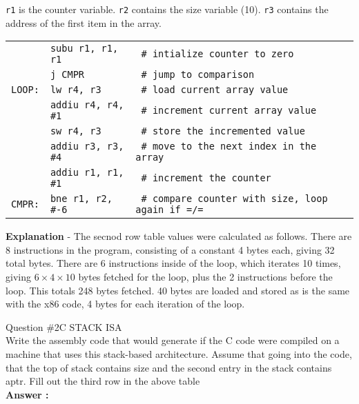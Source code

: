 \documentclass[a4paper,11pt]{article}
\newcommand{\answer}{\textbf{Answer : }}
\begin{document}
 \texttt{r1} is the counter variable. \texttt{r2} contains the size variable (10). \texttt{r3} contains the address of the first item in the array.
 \begin{center}
   \begin{tabular}{l l  l}
      \texttt{}      & \texttt{subu r1, r1, r1}    & \texttt{ \# intialize counter to zero} \\
      \texttt{}      & \texttt{j CMPR}             & \texttt{ \# jump to comparison} \\
      \texttt{LOOP:} & \texttt{lw r4, r3}          & \texttt{ \# load current array value} \\
      \texttt{}      & \texttt{addiu r4, r4, \#1}  & \texttt{ \# increment current array value} \\
      \texttt{}      & \texttt{sw r4, r3}          & \texttt{ \# store the incremented value} \\
      \texttt{}      & \texttt{addiu r3, r3, \#4}  & \texttt{ \# move to the next index in the array} \\
      \texttt{}      & \texttt{addiu r1, r1, \#1}  & \texttt{ \# increment the counter} \\
      \texttt{CMPR:} & \texttt{bne r1, r2, \#-6}   & \texttt{ \# compare counter with size, loop again if =/=} \\
   \end{tabular}
 \end{center}

 \textbf{Explanation} - The secnod row table values were calculated as follows. There are 8 instructions in the program, consisting of a constant 4 bytes each, giving 32 total bytes. There are 6 instructions inside of the loop, which iterates 10 times, giving $6\times 4 \times 10$ bytes fetched for the loop, plus the 2 instructions before the loop. This totals 248 bytes fetched. 40 bytes are loaded and stored as is the same with the x86 code, 4 bytes for each iteration of the loop.


 \item  Question \#2C STACK ISA \\ Write the assembly code that would generate if the C code were compiled on a machine that uses this stack-based architecture. Assume that going into the code, that the top of stack contains size and the second entry in the stack contains aptr. Fill out the third row in the above table 
 \\ \answer \\
\end{document}
